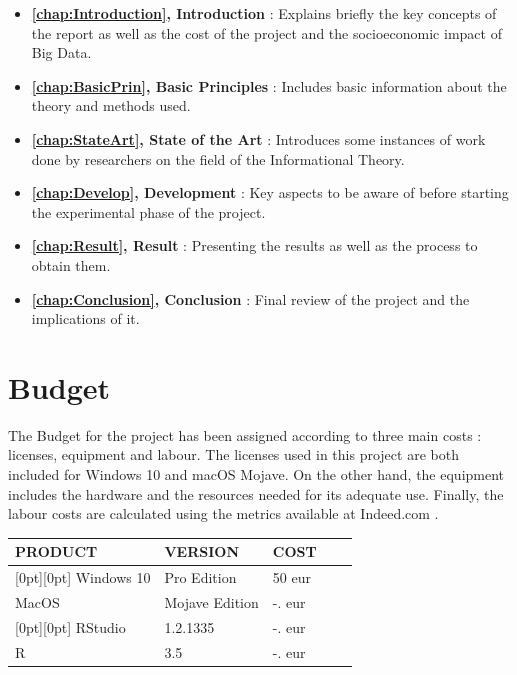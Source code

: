 \begin{itemize}
	\item \textbf{ \autoref{chap:Introduction}, Introduction} : Explains briefly the key concepts of the report as well as the cost of the project and the socioeconomic impact of Big Data.
	
	\item \textbf{ \autoref{chap:BasicPrin}, Basic Principles} : Includes basic information about the theory and methods used.
	
	\item \textbf{ \autoref{chap:StateArt}, State of the Art} : Introduces some instances of work done by researchers on the field of the Informational Theory.

	\item \textbf{ \autoref{chap:Develop}, Development} : Key aspects to be aware of before starting the experimental phase of the project.
	
	\item \textbf{ \autoref{chap:Result}, Result} : Presenting the results as well as the process to obtain them.
	
	\item \textbf{ \autoref{chap:Conclusion}, Conclusion} : Final review of the project and the implications of it.
	
\end{itemize}

\section{Budget}

The Budget for the project has been assigned according to three main costs : licenses, equipment and labour. The licenses used in this project are both included for Windows 10 and macOS Mojave. On the other hand, the equipment includes the hardware and the resources needed for its adequate use. Finally, the labour costs are calculated using the metrics available at Indeed.com \cite{ProgrammerSalaries}. \par
\begin{table}
	\centering 

\begin{tabular}{@{} l L L L @{} >{\kern\tabcolsep}l @{}}   

	\textbf{PRODUCT} & \textbf{VERSION} & \textbf{COST} \\ 
	\midrule[2pt]
	[0pt][0pt] Windows 10 & Pro Edition & 50 eur \\
     MacOS & Mojave Edition & -. eur \\
    [0pt][0pt] RStudio & 1.2.1335 & -. eur \\
    R & 3.5 & -. eur \\
	\bottomrule
	\hline
\end{tabular}
\end{table}



